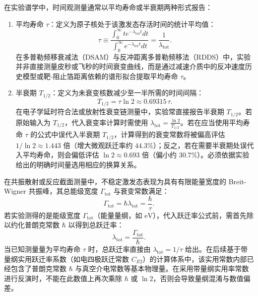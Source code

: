 在实验谱学中，时间观测量通常以平均寿命或半衰期两种形式报告：
\begin{enumerate}
\item 平均寿命 $\tau$：定义为原子核处于该激发态存活时间的统计平均值：
\begin{equation}\label{eq:5-9-tau}
\tau \equiv \frac{\int_0^\infty t e^{-\lambda_{\text{tot}} t} dt}{\int_0^\infty e^{-\lambda_{\text{tot}} t} dt} = \frac{1}{\lambda_{\text{tot}}}.
\end{equation}
在多普勒频移衰减法（DSAM）与反冲距离多普勒频移法（RDDS）中，实验并非直接测量皮秒或飞秒的时间衰变曲线，而是通过减速介质中的反冲速度历史模型或靶-阻止箔距离依赖的谱形拟合提取平均寿命 $\tau$。
\item 半衰期 $T_{1/2}$：定义为未衰变核数减少至一半所需的时间间隔：
\begin{equation}\label{eq:5-9-thalf}
T_{1/2} = \tau \ln 2 \approx 0.69315\,\tau.
\end{equation}
在电子学延时符合法或放射性衰变链测量中，实验常直接报告半衰期 $T_{1/2}$。若原始输入为 $T_{1/2}$，代入衰变率计算时需使用 $\lambda_{\text{tot}} = \frac{\ln 2}{T_{1/2}}$。若在应当使用平均寿命 $\tau$ 的公式中误代入半衰期 $T_{1/2}$，计算得到的衰变常数将被偏高评估 $1/\ln 2 \approx 1.443$ 倍（增大微观跃迁率约 $44.3\%$）；反之，若在需要半衰期处误代入平均寿命，则会偏低评估 $\ln 2 \approx 0.693$ 倍（偏小约 $30.7\%$）。必须依据实验给出的明确时间量选用相应的换算关系。
\end{enumerate}

在共振散射或反应截面测量中，不稳定激发态表现为具有有限能量宽度的 Breit-Wigner 共振峰，其总能级宽度 $\Gamma_{\text{tot}}$ 与衰变常数满足：
\begin{equation}\label{eq:5-9-gamma-tot}
\Gamma_{\text{tot}} = \hbar \lambda_{\text{tot}} = \frac{\hbar}{\tau}.
\end{equation}
若实验测得的是能级宽度 $\Gamma_{\text{tot}}$（能量量纲，如 $\text{eV}$），代入跃迁率公式前，需首先除以约化普朗克常数 $\hbar$ 以得到总跃迁率：
\begin{equation}\label{eq:5-9-gamma-to-lambda}
\lambda_{\text{tot}} = \frac{\Gamma_{\text{tot}}}{\hbar}.
\end{equation}
当已知测量量为平均寿命 $\tau$ 时，总跃迁率直接由 $\lambda_{\text{tot}} = 1/\tau$ 给出。在后续基于带量纲实用跃迁率系数（如电四极跃迁常数 $C_{E2}$）的计算体系中，该实用常数内部已经包含了普朗克常数 $\hbar$ 与真空介电常数等基本物理量。在采用带量纲实用率常数进行反演时，不能在此数值上再次乘除 $\hbar$ 或 $\ln 2$，否则会导致量纲混淆与数值偏差。

